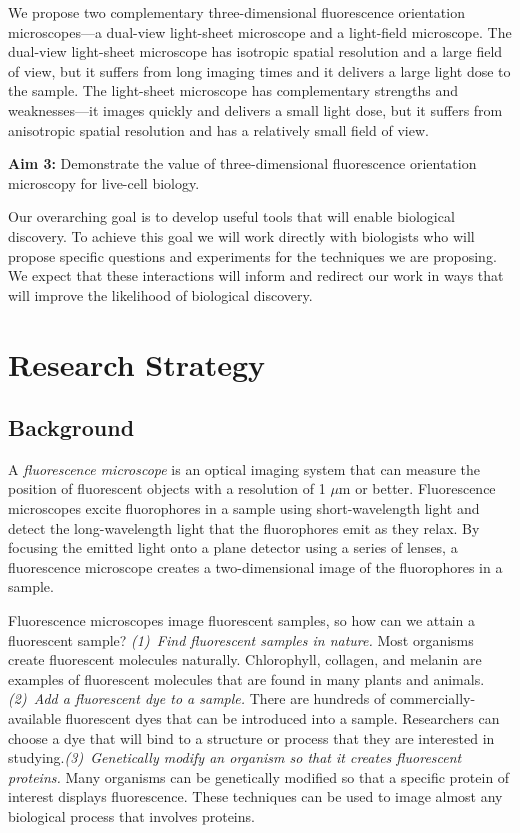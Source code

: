 \documentclass[11pt, draft]{article}
\begin{document}
We propose two complementary three-dimensional fluorescence orientation
microscopes---a dual-view light-sheet microscope and a light-field
microscope. The dual-view light-sheet microscope has isotropic spatial
resolution and a large field of view, but it suffers from long imaging times and
it delivers a large light dose to the sample. The light-sheet microscope has
complementary strengths and weaknesses---it images quickly and delivers a small
light dose, but it suffers from anisotropic spatial resolution and has a
relatively small field of view.

\noindent\textbf{Aim 3:} Demonstrate the value of three-dimensional fluorescence orientation
microscopy for live-cell biology.

Our overarching goal is to develop useful tools that will enable biological
discovery. To achieve this goal we will work directly with biologists who will
propose specific questions and experiments for the techniques we are
proposing. We expect that these interactions will inform and redirect our work
in ways that will improve the likelihood of biological discovery.

\pagebreak

\section*{Research Strategy}
\subsection*{Background}
A \textit{fluorescence microscope} is an optical imaging system that can measure
the position of fluorescent objects with a resolution of 1 $\mu$m or better.
Fluorescence microscopes excite fluorophores in a sample using short-wavelength
light and detect the long-wavelength light that the fluorophores emit as they
relax. By focusing the emitted light onto a plane detector using a series of
lenses, a fluorescence microscope creates a two-dimensional image of the
fluorophores in a sample.

Fluorescence microscopes image fluorescent samples, so how can we attain a
fluorescent sample? \textit{(1)~Find fluorescent samples in nature.} Most
organisms create fluorescent molecules naturally. Chlorophyll, collagen, and
melanin are examples of fluorescent molecules that are found in many plants and
animals. \textit{(2)~Add a fluorescent dye to a sample.}  There are hundreds of
commercially-available fluorescent dyes that can be introduced into a
sample. Researchers can choose a dye that will bind to a structure or process
that they are interested in studying.\hspace{0.4em}\textit{(3)~Genetically
  modify an organism so that it creates fluorescent proteins.} Many organisms
can be genetically modified so that a specific protein of interest displays
fluorescence. These techniques can be used to image almost any biological
process that involves proteins.
\end{document}

